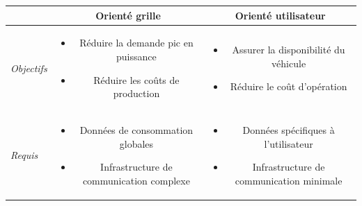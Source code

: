 \documentclass[french]{beamer}
\begin{document}
{\begin{frame}
\begin{tabular}{l|cc}
 			& \textbf{Orienté grille} & \textbf{Orienté utilisateur} \\ \hline
\emph{Objectifs} 	& 
\begin{minipage}{0.38\linewidth}\vspace{1em}
	\begin{itemize}
		\item Réduire la demande pic en puissance
		\item Réduire les coûts de production
	\end{itemize}\vspace{1em}
\end{minipage} 
& \begin{minipage}{0.38\linewidth}\vspace{1em}
	\begin{itemize}
		\item Assurer la disponibilité du véhicule
		\item Réduire le coût d'opération
	\end{itemize}\vspace{1em}
\end{minipage}  \\ \hline
\emph{Requis} & 
\begin{minipage}{0.38\linewidth}\vspace{1em}
	\begin{itemize}
		\item Données de consommation globales
		\item Infrastructure de communication complexe
	\end{itemize}
\end{minipage} 
& \begin{minipage}{0.38\linewidth}\vspace{1em}
	\begin{itemize}
		\item Données spécifiques à l'utilisateur
		\item Infrastructure de communication minimale
	\end{itemize}
\end{minipage}  \\
\end{tabular}
%


\end{frame}}
\end{document}
